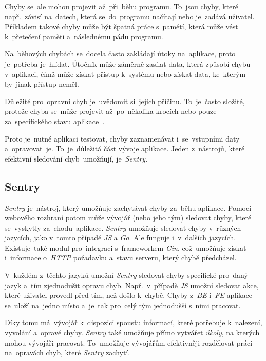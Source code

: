 \documentclass[11pt,a4paper]{report}
\let\oldacrshort\acrshort
\renewcommand{\acrshort}[1]{\emph{\normalsize\color[rgb]{0,0,0}\noindent\oldacrshort{#1}}}
\begin{document}
                Chyby se~ale mohou projevit až~při~běhu programu. To~jsou chyby, které např.~závisí na~datech, která se~do~programu načítají nebo je~zadává uživatel. Příkladem takové chyby může být špatná práce s~pamětí, která může vést k~přetečení paměti a~následnému pádu programu.

                Na~běhových chybách se~docela často zakládají útoky na~aplikace, proto je~potřeba je~hlídat. Útočník může záměrně zasílat data, která způsobí chybu v~aplikaci, čímž může získat přístup k~systému nebo získat data, ke~kterým by~jinak přístup neměl.

                Důležité pro~opravní chyb je~uvědomit si~jejich příčinu. To~je~často složité, protože chyba se~může projevit až~po~několika krocích nebo pouze za~specifického stavu aplikace~\cite{graham2021ethical}.

                Proto je~nutné aplikaci testovat, chyby zaznamenávat i~se~vstupními daty a~opravovat~je. To~je~důležitá část vývoje aplikace. Jeden z~nástrojů, které efektivní sledování chyb~umožňují, je~\emph{Sentry}.

            \subsection{Sentry}
                \emph{Sentry} je~nástroj, který umožňuje zachytávat chyby za~běhu aplikace. Pomocí webového rozhraní potom může vývojář (nebo jeho tým) sledovat chyby, které se~vyskytly za~chodu~aplikace. \emph{Sentry} umožňuje sledovat chyby v~různých jazycích, jako v~tomto případě \acrshort{JS} a \emph{Go}. Ale funguje i~v~dalších jazycích. Existuje~také modul pro~integraci s~frameworkem \emph{Gin}, což~umožňuje získat i~informace o~\acrshort{HTTP} požadavku a~stavu serveru, který chybě předcházel.
                
                V~každém z~těchto jazyků umožní \emph{Sentry} sledovat chyby specifické pro~daný jazyk a~tím zjednodušit opravu chyb. Např.~v~případě \acrshort{JS} umožní sledovat akce, které uživatel provedl před tím, než došlo k~chybě. Chyby z~\acrshort{BE} i~\acrshort{FE} aplikace se~uloží na~jedno místo a~je~tak pro~celý tým jednodušší s~nimi pracovat.

                Díky tomu má~vývojář k~dispozici spoustu informací, které potřebuje k~nalezení, vyvolání a~opravě chyby. \emph{Sentry} také umožňuje přímo vytvářet \emph{úkoly}, na kterých mohou vývojáři pracovat. To~umožňuje vývojářům efektivněji rozdělovat práci na~opravách chyb, které \emph{Sentry} zachytí.
\end{document}
